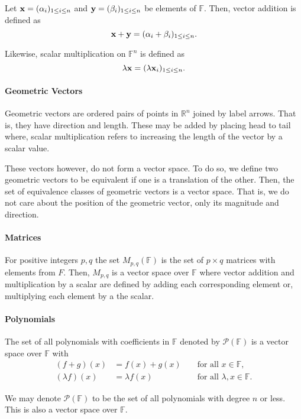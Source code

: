 Let \(\mathbf{x} = (\alpha_i)_{1\leq i \leq n}\)
and \(\mathbf{y} = (\beta_i)_{1\leq i \leq n}\) be elements of \(\mathbb{F}\).
Then, vector addition is defined as
\[
        \mathbf{x} + \mathbf{y} = (\alpha_i + \beta_i)_{1\leq i \leq n}.
\]

Likewise, scalar multiplication on \(\mathbb{F}^n\) is defined as
\[
    \lambda\mathbf{x} = (\lambda \mathbf{x}_i)_{1 \leq i \leq n}.
\]

\paragraph{Geometric Vectors}
Geometric vectors are ordered pairs of points in \(\mathbb{R}^n\)
joined by label arrows. That is, they have direction and length.
These may be added by placing head to tail where, scalar multiplication
refers to increasing the length of the vector by a scalar value.

These vectors however, do not form a vector space. To do so, we define two
geometric vectors to be equivalent if one is a translation of the other.
Then, the set of equivalence classes of geometric vectors is a vector space.
That is, we do not care about the position of the geometric vector,
only its magnitude and direction.

\paragraph{Matrices}
For positive integers \(p, q\) the set \(M_{p, q}(\mathbb{F})\)
is the set of \(p\times q\) matrices with elements from \(F\).
Then, \(M_{p, q}\) is a vector space over \(\mathbb{F}\)
where vector addition and multiplication by a scalar are defined
by adding each corresponding element or, multiplying each element
by a the scalar.

\paragraph{Polynomials}
The set of all polynomials with coefficients in \(\mathbb{F}\)
denoted by \(\mathcal{P}(\mathbb{F})\) is a vector space over
\(\mathbb{F}\) with
\begin{align*}
    (f+g)(x) &= f(x) + g(x) && \text{ for all } x\in \mathbb{F}, \\
    (\lambda f)(x) &= \lambda f(x) && \text{ for all } \lambda, x\in \mathbb{F}.
\end{align*}

We may denote \(\mathcal{P}(\mathbb{F})\) to be the set of all polynomials
with degree \(n\) or less. This is also a vector space over \(\mathbb{F}\).

